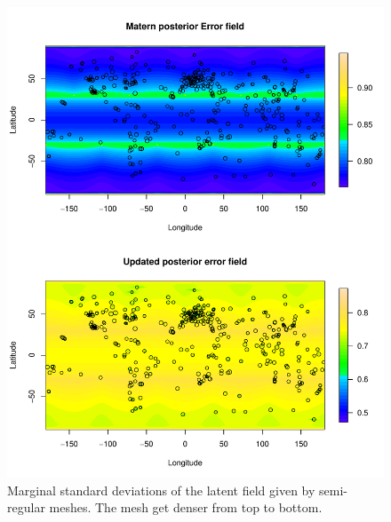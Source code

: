 \documentclass[a4paper,12pt]{article}
\begin{document}
\begin{figure}[htbp]
 \begin{center}
 \includegraphics[scale=0.8]{fig/reg_lMeshGIA_error_field.pdf}
 \end{center}
 \caption[Semi-regular mesh]{Marginal standard deviations of the latent field given by semi-regular meshes. The mesh get denser from top to bottom.}
 \label{fig:mesh_comp_hyper}
 \end{figure}
\end{document}
